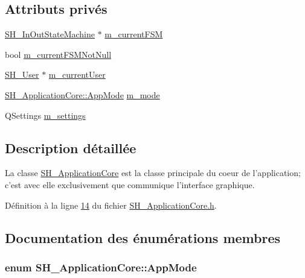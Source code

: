 \subsection*{Attributs privés}
\begin{DoxyCompactItemize}
\item 
\hyperlink{classSH__InOutStateMachine}{S\-H\-\_\-\-In\-Out\-State\-Machine} $\ast$ \hyperlink{classSH__ApplicationCore_a8e550daf4a5d49d88714b716953e4957}{m\-\_\-current\-F\-S\-M}
\item 
bool \hyperlink{classSH__ApplicationCore_a7a300f62c70a0b7b8554fe73982d1feb}{m\-\_\-current\-F\-S\-M\-Not\-Null}
\item 
\hyperlink{classSH__User}{S\-H\-\_\-\-User} $\ast$ \hyperlink{classSH__ApplicationCore_a2bd2432939b96af2a1003630df83da63}{m\-\_\-current\-User}
\item 
\hyperlink{classSH__ApplicationCore_a6b93b2f83a290305f282616eb2935899}{S\-H\-\_\-\-Application\-Core\-::\-App\-Mode} \hyperlink{classSH__ApplicationCore_ab2bb2bdb19e4969dee699e0d4ae33e25}{m\-\_\-mode}
\item 
Q\-Settings \hyperlink{classSH__ApplicationCore_a26684dd6552b4aea5860de641a326774}{m\-\_\-settings}
\end{DoxyCompactItemize}


\subsection{Description détaillée}
La classe \hyperlink{classSH__ApplicationCore}{S\-H\-\_\-\-Application\-Core} est la classe principale du coeur de l'application; c'est avec elle exclusivement que communique l'interface graphique. 

Définition à la ligne \hyperlink{SH__ApplicationCore_8h_source_l00014}{14} du fichier \hyperlink{SH__ApplicationCore_8h_source}{S\-H\-\_\-\-Application\-Core.\-h}.



\subsection{Documentation des énumérations membres}
\hypertarget{classSH__ApplicationCore_a6b93b2f83a290305f282616eb2935899}{
\subsubsection[{App\-Mode}]{\setlength{\rightskip}{0pt plus 5cm}enum {\bf S\-H\-\_\-\-Application\-Core\-::\-App\-Mode}}}\label{classSH__ApplicationCore_a6b93b2f83a290305f282616eb2935899}


